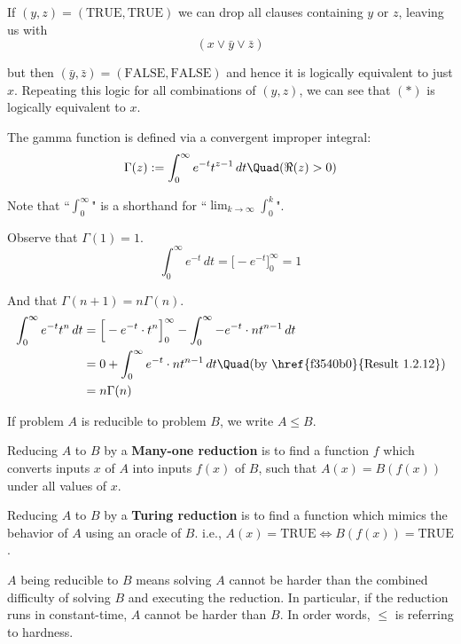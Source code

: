 If $(y,z)=(\text{TRUE},\text{TRUE})$ we can drop all clauses containing $y$ or
$z$, leaving us with
$$
  (x\lor \bar y\lor\bar z)
$$

but then $(\bar y,\bar z)=(\text{FALSE},\text{FALSE})$ and hence it is
logically equivalent to just $x$. Repeating this logic for all combinations of
$(y,z)$, we can see that $(*)$ is logically equivalent to $x$.


\label{ce1fa3f}

The gamma function is defined via a convergent improper integral:
$$
  \Gamma(z):=\int_0^\infty e^{-t}t^{z-1}\,dt\Quad(\Re(z)>0)
$$

Note that ``$\displaystyle\int_0^\infty$" is a shorthand for
``$\displaystyle\lim_{k\to\infty}\int_0^k$".

Observe that $\Gamma(1)=1$.
$$\int_0^\infty e^{-t}\,dt=\Big[-e^{-t}\Big]_0^\infty=1$$

And that $\Gamma(n+1)=n\Gamma(n)$.
\begin{align*}
  \int_0^\infty e^{-t}t^n\,dt
   & = \Big[-e^{-t}\cdot t^n\Big]_0^\infty-\int_0^\infty-e^{-t}\cdot nt^{n-1}\,dt              \\
   & = 0+\int_0^\infty e^{-t}\cdot nt^{n-1}\,dt \Quad\text{(by \href{f3540b0}{Result 1.2.12})} \\
   & = n\Gamma(n)
\end{align*}

\label{e009acb}

If problem $A$ is reducible to problem $B$, we write $A\leq B$.

Reducing $A$ to $B$ by a \textbf{Many-one reduction} is to find a function $f$
which converts inputs $x$ of $A$ into inputs $f(x)$ of $B$, such that
$A(x)=B(f(x))$ under all values of $x$.

Reducing $A$ to $B$ by a \textbf{Turing reduction} is to find a function which
mimics the behavior of $A$ using an oracle of $B$. i.e., $A(x)=\text{TRUE}\iff
B(f(x))=\text{TRUE}$.

$A$ being reducible to $B$ means solving $A$ cannot be harder than the
combined difficulty of solving $B$ and executing the reduction. In
particular, if the reduction runs in constant-time, $A$ cannot be
harder than $B$. In order words, $\leq$ is referring to hardness.

